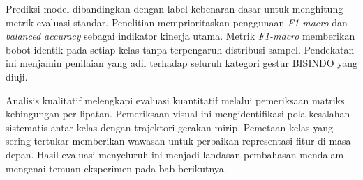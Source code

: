 Prediksi model dibandingkan dengan label kebenaran dasar untuk menghitung metrik evaluasi standar. 
Penelitian memprioritaskan penggunaan \textit{F1-macro} dan \textit{balanced accuracy} sebagai indikator kinerja utama. 
Metrik \textit{F1-macro} memberikan bobot identik pada setiap kelas tanpa terpengaruh distribusi sampel. 
Pendekatan ini menjamin penilaian yang adil terhadap seluruh kategori gestur BISINDO yang diuji.

Analisis kualitatif melengkapi evaluasi kuantitatif melalui pemeriksaan matriks kebingungan per lipatan. 
Pemeriksaan visual ini mengidentifikasi pola kesalahan sistematis antar kelas dengan trajektori gerakan mirip. 
Pemetaan kelas yang sering tertukar memberikan wawasan untuk perbaikan representasi fitur di masa depan. 
Hasil evaluasi menyeluruh ini menjadi landasan pembahasan mendalam mengenai temuan eksperimen pada bab berikutnya.